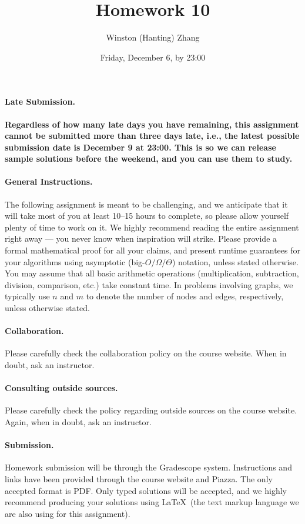 \documentclass[10pt]{article}
\title{\bf Homework 10}
\author{Winston (Hanting) Zhang}
\date{Friday, December 6, by 23:00}
\begin{document}
\maketitle 

\paragraph{Late Submission.} \textbf{Regardless of how many late days you have remaining, this assignment cannot be submitted more than three days late, i.e., the latest possible submission date is December 9 at 23:00. This is so we can release sample solutions before the weekend, and you can use them to study.}
  
\paragraph{General Instructions.} The following assignment is meant to be challenging, and we anticipate that it will take most of you at least 10--15 hours to complete, so please allow yourself plenty of time to work on it.
We highly recommend reading the entire assignment right away --- you never know when inspiration will strike.
Please provide a formal mathematical proof for all your claims, and  present runtime guarantees for your algorithms using asymptotic (big-$O/\Omega/\Theta$) notation, unless stated otherwise. You may assume that all basic arithmetic operations (multiplication, subtraction, division, comparison, etc.) take constant time. In problems involving graphs, we typically use $n$ and $m$ to denote the number of nodes and edges, respectively, unless otherwise stated.

\paragraph{Collaboration.}  Please carefully check the collaboration policy on the course website. When in doubt, ask an instructor.

\paragraph{Consulting outside sources.} Please carefully check the policy regarding outside sources on the course website. Again, when in doubt, ask an instructor.

\paragraph{Submission.} Homework submission will be through the Gradescope system. Instructions and links have been provided through the course website and Piazza. The only accepted format is PDF. Only typed solutions will be accepted, and we highly recommend producing your solutions using \LaTeX~(the text markup language we are also using for this assignment).
\end{document}

